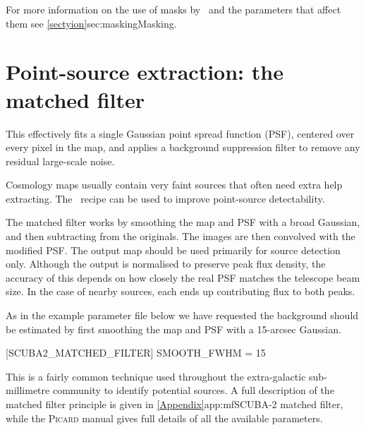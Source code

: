 For more information on the use of masks by \makemap\ and the
parameters that affect them see \cref{sectyion}{sec:masking}{Masking}.



\section{Point-source extraction: the matched filter}
\label{sec:mf}

This effectively fits a single Gaussian point spread function (PSF),
centered over every pixel in the map, and applies a background
suppression filter to remove any residual large-scale noise.

Cosmology maps usually contain very faint sources that often need
extra help extracting. The \picard\ recipe
can be used to improve point-source detectability.

The matched filter works by smoothing the map and PSF with a broad
Gaussian, and then subtracting from the originals. The images are then
convolved with the modified PSF. The output map should be used
primarily for source detection only. Although the output is normalised
to preserve peak flux density, the accuracy of this depends on how
closely the real PSF matches the telescope beam size. In the case of
nearby sources, each ends up contributing flux to both peaks.

\begin{terminalv}
\end{terminalv}

As in the example parameter file below we have requested the
background should be estimated by first smoothing the map and PSF with
a 15-arcsec Gaussian.

\begin{terminalv}

[SCUBA2_MATCHED_FILTER]
SMOOTH_FWHM = 15

\end{terminalv}

This is a fairly common technique used throughout the extra-galactic
sub-millimetre community to identify potential sources. A full
description of the matched filter principle is given in
\cref{Appendix}{app:mf}{SCUBA-2 matched filter}, while the
\textsc{Picard} manual gives full details of all the available
parameters.

